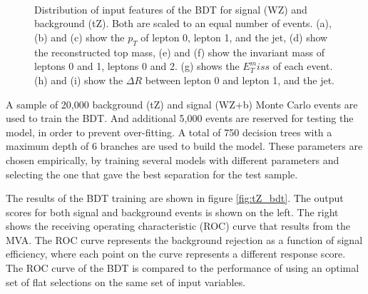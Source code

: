 \begin{figure}[H]
\center
    \\
    \\
    \\                          
    
    \caption{Distribution of input features of the BDT for signal (WZ) and background (tZ). Both are scaled to an equal number of events. (a), (b) and (c) show the $p_T$ of lepton 0, lepton 1, and the jet, (d) show the reconstructed top mass, (e) and (f) show the invariant mass of leptons 0 and 1, leptons 0 and 2. (g) shows the $E_T^miss$ of each event. (h) and (i) show the $\Delta R$ between lepton 0 and lepton 1, and the jet.}
    \label{fig:tZ_kinematics}
\end{figure}

A sample of 20,000 background (tZ) and signal (WZ+b) Monte Carlo events are used to train the BDT. And additional 5,000 events are reserved for testing the model, in order to prevent over-fitting. A total of 750 decision trees with a maximum depth of 6 branches are used to build the model. These parameters are chosen empirically, by training several models with different parameters and selecting the one that gave the best separation for the test sample. 

The results of the BDT training are shown in figure \ref{fig:tZ_bdt}. The output scores for both signal and background events is shown on the left. The right shows the receiving operating characteristic (ROC) curve that results from the MVA. The ROC curve represents the background rejection as a function of signal efficiency, where each point on the curve represents a different response score. The ROC curve of the BDT is compared to the performance of using an optimal set of flat selections on the same set of input variables.

